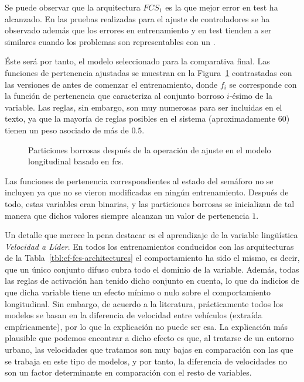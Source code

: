 Se puede observar que la arquitectura $FCS_1$ es la que mejor error en test ha alcanzado. En las pruebas realizadas para el ajuste de controladores se ha observado además que los errores en entrenamiento y en test tienden a ser similares cuando los problemas son representables con un .

Éste será por tanto, el modelo seleccionado para la comparativa final. Las funciones de pertenencia ajustadas se muestran en la Figura~\ref{fig:adjusted-fuzzy-partitions} contrastadas con las versiones de antes de comenzar el entrenamiento, donde $f_i$ se corresponde con la función de pertenencia que caracteriza al conjunto borroso $i$-ésimo de la variable. Las reglas, sin embargo, son muy numerosas para ser incluidas en el texto, ya que la mayoría de reglas posibles en el sistema (aproximadamente $60$) tienen un peso asociado de más de $0.5$.

\begin{figure}
	\centering
	\qquad
	\qquad
	\qquad
	\caption[Particiones borrosas después de la operación de ajuste en el modelo longitudinal basado en \acrshort{fcs}]{Particiones borrosas después de la operación de ajuste en el modelo longitudinal basado en \acrshort{fcs}.}
	\label{fig:adjusted-fuzzy-partitions}
\end{figure}

Las funciones de pertenencia correspondientes al estado del semáforo no se incluyen ya que no se vieron modificadas en ningún entrenamiento. Después de todo, estas variables eran binarias, y las particiones borrosas se inicializan de tal manera que dichos valores siempre alcanzan un valor de pertenencia $1$.

Un detalle que merece la pena destacar es el aprendizaje de la variable lingüística \textit{Velocidad a Líder}. En todos los entrenamientos conducidos con las arquitecturas de la Tabla~\ref{tbl:cf-fcs-architectures} el comportamiento ha sido el mismo, es decir, que un único conjunto difuso cubra todo el dominio de la variable. Además, todas las reglas de activación han tenido dicho conjunto en cuenta, lo que da indicios de que dicha variable tiene un efecto mínimo o nulo sobre el comportamiento longitudinal. Sin embargo, de acuerdo a la literatura, prácticamente todos los modelos se basan en la diferencia de velocidad entre vehículos (extraída empíricamente), por lo que la explicación no puede ser esa. La explicación más plausible que podemos encontrar a dicho efecto es que, al tratarse de un entorno urbano, las velocidades que tratamos son muy bajas en comparación con las que se trabaja en este tipo de modelos, y por tanto, la diferencia de velocidades no son un factor determinante en comparación con el resto de variables.

